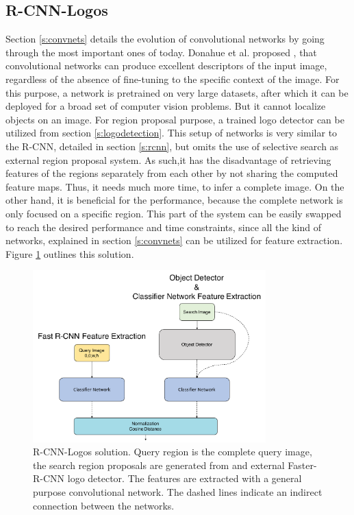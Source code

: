 \subsection{R-CNN-Logos}\label{ss:solution4}
Section \ref{s:convnets} details the evolution of convolutional networks by going through the most important ones of today. Donahue et al. proposed \cite{DBLP:journals/corr/DonahueJVHZTD13}, that convolutional networks can produce excellent descriptors of the input image, regardless of the absence of fine-tuning to the specific context of the image. For this purpose, a network is pretrained on very large datasets, after which it can be deployed for a broad set of computer vision problems. But it cannot localize objects on an image. For region proposal purpose, a trained logo detector can be utilized from section \ref{s:logodetection}. This setup of networks is very similar to the R-CNN, detailed in section \ref{s:rcnn}, but omits the use of selective search as external region proposal system. As such,it has the disadvantage of retrieving features of the regions separately from each other by not sharing the computed feature maps. Thus, it needs much more time, to infer a complete image. On the other hand, it is beneficial for the performance, because the complete network is only focused on a specific region. This part of the system can be easily swapped to reach the desired performance and time constraints, since all the kind of networks, explained in section \ref{s:convnets} can be utilized for feature extraction. Figure \ref{f:sol4arch} outlines this solution.
\begin{figure}
  \centering
  \includegraphics[width=90mm]{images/mt/sol4_arch.pdf}
  \caption{R-CNN-Logos solution. Query region is the complete query image, the search region proposals are generated from and external Faster-R-CNN logo detector. The features are extracted with a general purpose convolutional network. The dashed lines indicate an indirect connection between the networks.}
  \label{f:sol4arch}
\end{figure}

